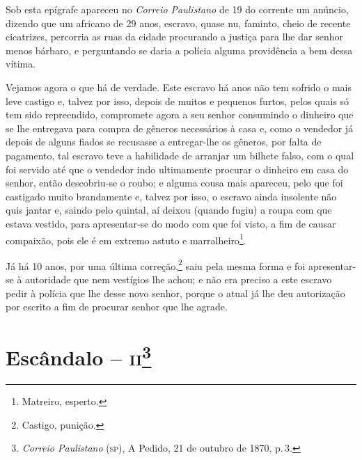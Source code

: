 Sob esta epígrafe apareceu no \emph{Correio Paulistano} de 19 do
corrente um anúncio, dizendo que um africano de 29 anos, escravo, quase
nu, faminto, cheio de recente cicatrizes, percorria as ruas da cidade
procurando a justiça para lhe dar senhor menos bárbaro, e perguntando se
daria a polícia alguma providência a bem dessa vítima.

Vejamos agora o que há de verdade. Este escravo há anos não tem sofrido
o mais leve castigo e, talvez por isso, depois de muitos e pequenos
furtos, pelos quais só tem sido repreendido, compromete agora a seu
senhor consumindo o dinheiro que se lhe entregava para compra de gêneros
necessários à casa e, como o vendedor já depois de alguns fiados se
recusasse a entregar-lhe os gêneros, por falta de pagamento, tal escravo
teve a habilidade de arranjar um bilhete falso, com o qual foi servido
até que o vendedor indo ultimamente procurar o dinheiro em casa do
senhor, então descobriu-se o roubo; e alguma cousa mais apareceu, pelo
que foi castigado muito brandamente e, talvez por isso, o escravo ainda
insolente não quis jantar e, saindo pelo quintal, aí deixou (quando
fugiu) a roupa com que estava vestido, para apresentar-se do modo com
que foi visto, a fim de causar compaixão, pois ele é em extremo astuto e
marralheiro\footnote{ Matreiro, esperto.}.

Já há 10 anos, por uma última correção,\footnote{ Castigo, punição.}
saiu pela mesma forma e foi apresentar-se à autoridade que nem vestígios
lhe achou; e não era preciso a este escravo pedir à polícia que lhe
desse novo senhor, porque o atual já lhe deu autorização por escrito a
fim de procurar senhor que lhe agrade.

\asterisc{}

\chapter{Escândalo -- \textsc{ii}\footnote{\emph{Correio Paulistano} (\textsc{sp}), A Pedido, 21 de outubro de 1870,
  p.\,3.}} %

